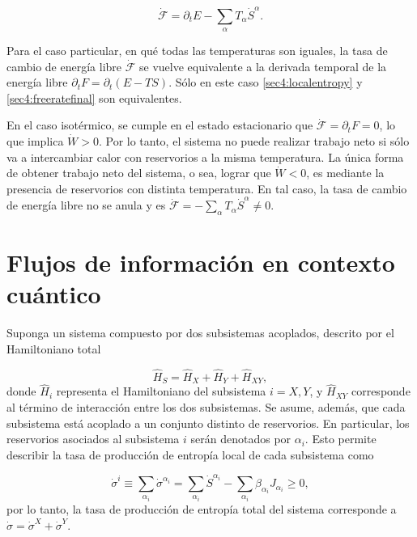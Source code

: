 \begin{equation*}
    \dot{\mathcal{F}} = \partial_{t}E - \sum_{\alpha}T_{\alpha} \dot{S}^{\alpha}.
\end{equation*}

Para el caso particular, en qué todas las temperaturas son iguales, la tasa de cambio de energía libre $\dot{\mathcal{F}}$ se vuelve equivalente a la derivada temporal de la energía libre $\partial_{t}F = \partial_{t}(E-TS)$. Sólo en este caso \ref{sec4:localentropy} y \ref{sec4:freeratefinal} son equivalentes.

En el caso isotérmico, se cumple en el estado estacionario que $\dot{\mathcal{F}} = \partial_{t}F = 0$, lo que implica $\dot{W}>0$. Por lo tanto, el sistema no puede realizar trabajo neto si sólo va a intercambiar  calor con reservorios a la misma temperatura. La única forma de obtener trabajo neto del sistema, o sea, lograr que $\dot{W}<0$, es mediante la presencia de reservorios con distinta temperatura.  En tal caso, la tasa de cambio de energía libre no se anula y es $\dot{\mathcal{F}} = - \sum_{\alpha} T_{\alpha} \dot{S}^{\alpha} \neq 0$.   

\section{Flujos de información en contexto cuántico}
Suponga un sistema compuesto por dos subsistemas acoplados, descrito por el Hamiltoniano total

\begin{equation*}
    \hat{H}_{S} = \hat{H}_{X} + \hat{H}_{Y} + \hat{H}_{XY}, 
\end{equation*}
donde $\hat{H}_{i}$ representa el Hamiltoniano del subsistema $i=X,Y$, y $\hat{H}_{XY}$ corresponde al término de interacción entre los dos subsistemas. Se asume, además, que cada subsistema está acoplado a un conjunto distinto de reservorios. En particular, los reservorios asociados al subsistema $i$ serán denotados por $\alpha_{i}$. Esto permite describir la tasa de producción de entropía local de cada subsistema como

\begin{equation*}
    \dot{\sigma}^{i} \equiv \sum_{\alpha_{i}} \dot{\sigma}^{\alpha_{i}} = \sum_{\alpha_{i}} \dot{S}^{\alpha_{i}} - \sum_{\alpha_{i}} \beta_{\alpha_{i}} J_{\alpha_{i}} \geq 0,
\end{equation*}
por lo tanto, la tasa de producción de entropía total del sistema corresponde a $\dot{\sigma} = \dot{\sigma}^{X} + \dot{\sigma}^{Y}$. 

